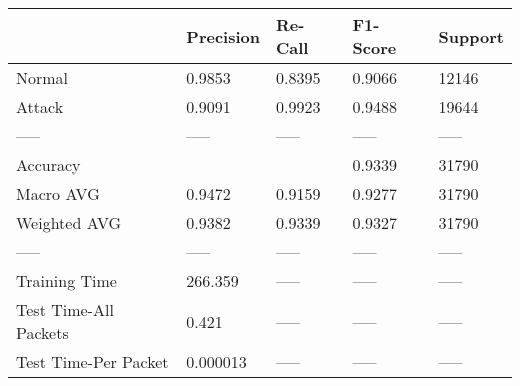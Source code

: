 \begin{tabular}{lllll}
\toprule
{} & Precision & Re-Call & F1-Score & Support \\
\midrule
Normal                &    0.9853 &  0.8395 &   0.9066 &   12146 \\
Attack                &    0.9091 &  0.9923 &   0.9488 &   19644 \\
-----                 &     ----- &   ----- &    ----- &   ----- \\
Accuracy              &           &         &   0.9339 &   31790 \\
Macro AVG             &    0.9472 &  0.9159 &   0.9277 &   31790 \\
Weighted AVG          &    0.9382 &  0.9339 &   0.9327 &   31790 \\
-----                 &     ----- &   ----- &    ----- &   ----- \\
Training Time         &   266.359 &   ----- &    ----- &   ----- \\
Test Time-All Packets &     0.421 &   ----- &    ----- &   ----- \\
Test Time-Per Packet  &  0.000013 &   ----- &    ----- &   ----- \\
\bottomrule
\end{tabular}
